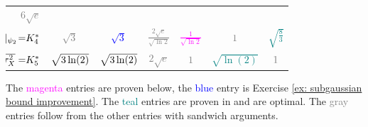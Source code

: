\begin{mdframed}[innertopmargin=0pt]
\begin{theorem}
\begin{center}
{\begin{tabular}{r r | c c c c c c}
            & \textcolor{gray}{\(6\sqrt{e}\)}
            \\
            & \(\mathllap{\norm{X}_{\psi_2}\! =}K_4^*\)
            & \textcolor{gray}{\(\sqrt{3}\)}
            & \textcolor{blue}{\(\sqrt{3}\)}
            & \textcolor{gray}{\(\frac{2\sqrt{e}}{\sqrt{\ln 2}}\)}
            & \textcolor{magenta}{\(\frac1{\sqrt{\ln 2}}\)}
            & \(\textcolor{gray}1\)
            & \textcolor{teal}{\(\sqrt{\frac83}\)}
            \\
            & \(\mathllap{\sqrt{\varProx{X}}=} K_5^*\)
            & \textcolor{gray}{\(\scriptsize\sqrt{3\ln(2)}\)}
            & \textcolor{gray}{\(\scriptsize\sqrt{3\ln(2)}\)}
            & \textcolor{gray}{\(2\sqrt{e}\)}
            & \textcolor{gray}{\(1\)}
            & \textcolor{teal}{\(\sqrt{\ln(2)}\)}
            & \(\textcolor{gray}1\)
        \end{tabular}
        \hspace{0.1em}
        \begin{minipage}{0.32\textwidth}
        The \textcolor{magenta}{magenta}
        entries are proven below, the
        \textcolor{blue}{blue} entry is Exercise \ref{ex: subgaussian bound improvement}.
        The \textcolor{teal}{teal} entries are proven in \citep{leskelaSharpConstantsRelating2026}
        and are optimal.
        The \textcolor{gray}{gray} entries follow from the other entries with
        sandwich arguments.
        \end{minipage}
        }
    \end{center}
\end{theorem}
\end{mdframed}

